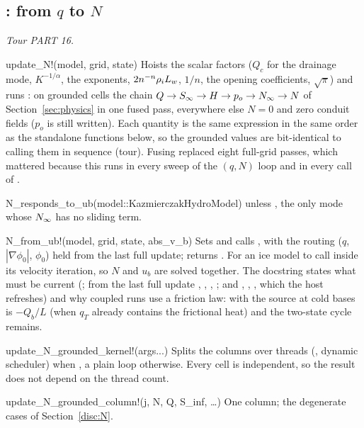 \subsection{: from $q$ to $N$}\label{ref:k24ep}
\emph{Tour PART 16.}
\begin{fnlist}
\item[update\_N!(model, grid, state)] Hoists the scalar factors ($Q_c$ for the drainage mode, $K^{-1/\alpha}$, the exponents,
  $2n^{-n}{\rho_i} L_w$, $1/n$, the opening coefficients, $\sqrt\pi$) and runs : on grounded cells
  the chain $Q\to{S_\infty}\to H\to p_o\to{N_\infty}\to N$ of Section~\ref{sec:physics} in one fused pass, everywhere else $N = 0$ and zero
  conduit fields ($p_o$ is still written). Each quantity is the same expression in the same order as the standalone functions
  below, so the grounded values are bit-identical to calling them in sequence (tour). Fusing replaced eight full-grid
  passes, which mattered because this runs in every sweep of the $(q, N)$ loop and in every call of .
\item[N\_responds\_to\_ub(model::KazmierczakHydroModel)]  unless , the only mode whose ${N_\infty}$ has no sliding
  term.
\item[N\_from\_ub!(model, grid, state, abs\_v\_b)] Sets  and calls , with the routing ($q$,
  $|\nabla\phi_0|$, $\phi_0$) held from the last full update; returns . For an ice model to call inside its velocity
  iteration, so $N$ and $u_b$ are solved together. The docstring states what must be current (; from the last full
  update , , , ; and , , , which the host
  refreshes) and why coupled runs use a friction law: with  the source at cold bases is $-Q_b/L$ (when $q_T$
  already contains the frictional heat) and the two-state cycle remains.
\item[update\_N\_grounded\_kernel!(args...)] Splits the columns over threads (, dynamic scheduler) when
  , a plain loop otherwise. Every cell is independent, so the result does not depend on the thread count.
\item[update\_N\_grounded\_column!(j, N, Q, S\_inf, \ldots)] One column; the degenerate cases of Section~\ref{disc:N}.

\end{fnlist}
